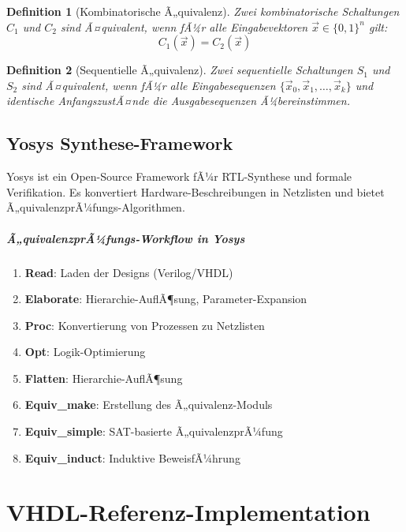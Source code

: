 ﻿\documentclass[12pt,a4paper]{report}
\newtheorem{definition}{Definition}[section]
\begin{document}
\begin{definition}[Kombinatorische Ã„quivalenz]
Zwei kombinatorische Schaltungen $C_1$ und $C_2$ sind Ã¤quivalent, wenn fÃ¼r alle Eingabevektoren $\vec{x} \in \{0,1\}^n$ gilt:
\[
C_1(\vec{x}) = C_2(\vec{x})
\]
\end{definition}

\begin{definition}[Sequentielle Ã„quivalenz]
Zwei sequentielle Schaltungen $S_1$ und $S_2$ sind Ã¤quivalent, wenn fÃ¼r alle Eingabesequenzen $\{\vec{x}_0, \vec{x}_1, \ldots, \vec{x}_k\}$ und identische AnfangszustÃ¤nde die Ausgabesequenzen Ã¼bereinstimmen.
\end{definition}

\section{Yosys Synthese-Framework}

Yosys ist ein Open-Source Framework fÃ¼r RTL-Synthese und formale Verifikation. Es konvertiert Hardware-Beschreibungen in Netzlisten und bietet Ã„quivalenzprÃ¼fungs-Algorithmen.

\paragraph{Ã„quivalenzprÃ¼fungs-Workflow in Yosys}

\begin{enumerate}
    \item \textbf{Read}: Laden der Designs (Verilog/VHDL)
    \item \textbf{Elaborate}: Hierarchie-AuflÃ¶sung, Parameter-Expansion
    \item \textbf{Proc}: Konvertierung von Prozessen zu Netzlisten
    \item \textbf{Opt}: Logik-Optimierung
    \item \textbf{Flatten}: Hierarchie-AuflÃ¶sung
    \item \textbf{Equiv\_make}: Erstellung des Ã„quivalenz-Moduls
    \item \textbf{Equiv\_simple}: SAT-basierte Ã„quivalenzprÃ¼fung
    \item \textbf{Equiv\_induct}: Induktive BeweisfÃ¼hrung
\end{enumerate}

\chapter{VHDL-Referenz-Implementation}
\end{document}
